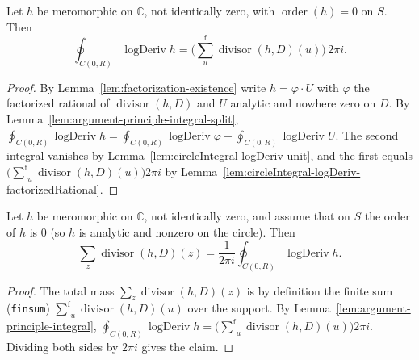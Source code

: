 \begin{lemma}
    \label{lem:argument-principle-integral}
    \leanok
    Let $h$ be meromorphic on $\mathbb{C}$, not identically zero, with
    $\operatorname{order}(h) = 0$ on $S$. Then
    \[
        \oint_{C(0,R)}\operatorname{logDeriv} h
          = \Big(\operatorname*{{\textstyle\sum}^{\mathrm f}}_{u}
            \operatorname{divisor}(h,D)(u)\Big)\, 2\pi i .
    \]
\end{lemma}
\begin{proof}
    By Lemma~\ref{lem:factorization-existence} write $h = \varphi\cdot U$ with
    $\varphi$ the factorized rational of $\operatorname{divisor}(h,D)$ and $U$
    analytic and nowhere zero on $D$. By
    Lemma~\ref{lem:argument-principle-integral-split},
    $\oint_{C(0,R)}\operatorname{logDeriv} h =
    \oint_{C(0,R)}\operatorname{logDeriv}\varphi +
    \oint_{C(0,R)}\operatorname{logDeriv} U$. The second integral vanishes by
    Lemma~\ref{lem:circleIntegral-logDeriv-unit}, and the first equals
    $\big(\operatorname*{{\textstyle\sum}^{\mathrm f}}_{u}
    \operatorname{divisor}(h,D)(u)\big)2\pi i$ by
    Lemma~\ref{lem:circleIntegral-logDeriv-factorizedRational}.
\end{proof}

\begin{theorem}
    \label{thm:argument-principle}
    \leanok
    Let $h$ be meromorphic on $\mathbb{C}$, not identically zero, and assume that
    on $S$ the order of $h$ is $0$ (so $h$ is analytic and nonzero on the
    circle). Then
    \[
        \sum_{z}\operatorname{divisor}(h,D)(z)
          = \frac{1}{2\pi i}\oint_{C(0,R)} \operatorname{logDeriv} h .
    \]
\end{theorem}
\begin{proof}
    The total mass $\sum_z \operatorname{divisor}(h,D)(z)$ is by definition the
    finite sum (\texttt{finsum})
    $\operatorname*{{\textstyle\sum}^{\mathrm f}}_{u}\operatorname{divisor}(h,D)(u)$
    over the support. By Lemma~\ref{lem:argument-principle-integral},
    $\oint_{C(0,R)}\operatorname{logDeriv} h =
    \big(\operatorname*{{\textstyle\sum}^{\mathrm f}}_{u}
    \operatorname{divisor}(h,D)(u)\big)2\pi i$. Dividing both sides by $2\pi i$
    gives the claim.
\end{proof}


